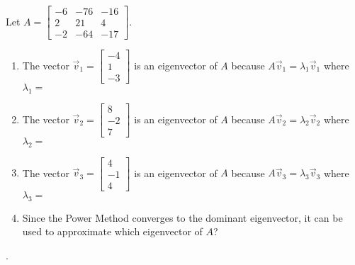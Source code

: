 \documentclass{ximera}
\author{}
\begin{document}
\begin{exercise}
Let $A=\begin{bmatrix} -6 & -76 & -16 \\ 2 & 21 & 4 \\ -2 & -64 & -17 \end{bmatrix}$.

\begin{enumerate}
    \item The vector $\vec{v}_1=\begin{bmatrix}-4\\1\\-3\end{bmatrix}$ is an eigenvector of $A$ because $A\vec{v}_1= \lambda_1 \vec{v}_1$ where $\lambda_1 = $
 \begin{multipleChoice}
 \end{multipleChoice}

\item The vector $\vec{v}_2=\begin{bmatrix}8\\-2\\7\end{bmatrix}$ is an eigenvector of $A$ because $A\vec{v}_2= \lambda_2 \vec{v}_2$ where $\lambda_2 = $
 \begin{multipleChoice}
 \end{multipleChoice}

\item The vector $\vec{v}_3=\begin{bmatrix}4\\-1\\4\end{bmatrix}$ is an eigenvector of $A$ because $A\vec{v}_3= \lambda_3 \vec{v}_3$ where $\lambda_3 = $
 \begin{multipleChoice}
 \end{multipleChoice}

\item Since the Power Method converges to the dominant eigenvector, it can be used to approximate which eigenvector of $A$?
 \begin{multipleChoice}
 \end{multipleChoice}
\end{enumerate}


.

 \end{exercise}
 
\end{document}
